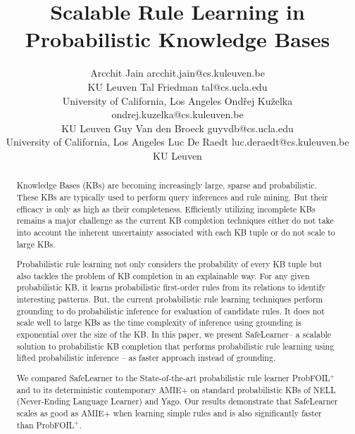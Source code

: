 \documentclass[akbc,twoside,11pt]{article}
\newcommand{\algorithmname}{SafeLearner\xspace}
\begin{document}
\title{Scalable Rule Learning in Probabilistic Knowledge Bases}

\author{\name Arcchit Jain \email arcchit.jain@cs.kuleuven.be\\\addr KU Leuven
       \AND \name Tal Friedman \email tal@cs.ucla.edu \\\addr University of California, Los Angeles
       \AND \name Ond\v{r}ej Ku\v{z}elka \email ondrej.kuzelka@cs.kuleuven.be \\\addr KU Leuven
       \AND \name Guy Van den Broeck \email guyvdb@cs.ucla.edu \\\addr University of California, Los Angeles
       \AND \name Luc De Raedt \email luc.deraedt@cs.kuleuven.be \\\addr KU Leuven}


\maketitle

\begin{abstract}
Knowledge Bases (KBs) are becoming increasingly large, sparse and probabilistic. These KBs are typically used to perform query inferences and rule mining. But their efficacy is only as high as their completeness. Efficiently utilizing incomplete KBs remains a major challenge as the current KB completion techniques either do not take into account the inherent uncertainty associated with each KB tuple or do not scale to large KBs.

Probabilistic rule learning not only considers the probability of every KB tuple but also tackles the problem of KB completion in an explainable way. For any given probabilistic KB, it learns probabilistic first-order rules from its relations to identify interesting patterns. But, the current probabilistic rule learning techniques perform grounding to do probabilistic inference for evaluation of candidate rules. It does not scale well to large KBs as the time complexity of inference using grounding is exponential over the size of the KB. In this paper, we present \algorithmname -- a scalable solution to probabilistic KB completion that performs probabilistic rule learning using lifted probabilistic inference -- as faster approach instead of grounding. 

We compared \algorithmname to the State-of-the-art probabilistic rule learner ProbFOIL$^+$ and to its deterministic contemporary AMIE+ on standard probabilistic KBs of NELL (Never-Ending Language Learner) and Yago. Our results demonstrate that \algorithmname scales as good as AMIE+ when learning simple rules and is also significantly faster than ProbFOIL$^+$. 
\end{abstract}
\end{document}
